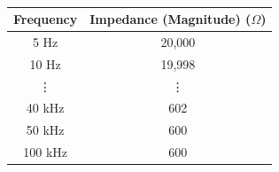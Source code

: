 \documentclass[12pt]{article}
\begin{document}
\renewcommand{\arraystretch}{1.2}	%
\begin{table}[H]
	\centering
	\caption{\jadual}	%
	\begin{tabular}{|c|c|}
		\hline
		\multicolumn{1}{|l|}{\textbf{Frequency}} & \multicolumn{1}{l|}{\textbf{Impedance (Magnitude) ($\Omega$)}} \\
		\hline
		5 Hz  & 20,000 \\
		10 Hz & 19,998 \\
		\vdots     & \vdots \\
		40 kHz & 602 \\
		50 kHz & 600 \\
		100 kHz & 600 \\
		\hline
	\end{tabular}
	\label{table:freqmag3}%
\end{table}%

\paperend
\end{document}

